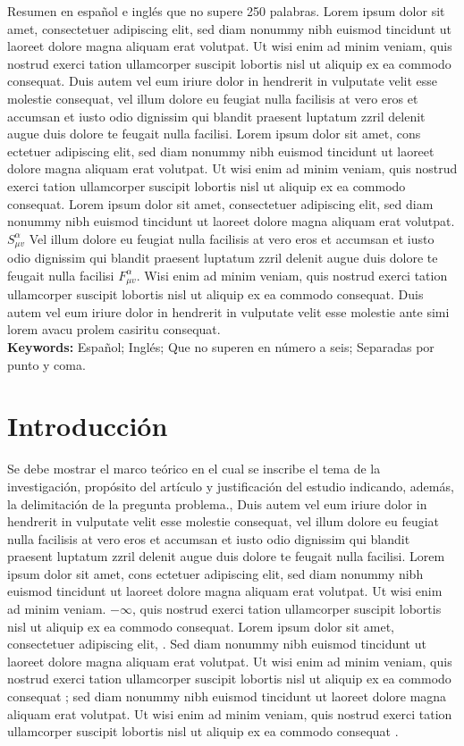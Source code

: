 \documentclass[9pt]{article}
\begin{document}
\justifying
Resumen en español e inglés que no supere 250 palabras. Lorem ipsum dolor sit amet, consectetuer adipiscing elit, sed diam nonummy nibh euismod tincidunt ut laoreet dolore magna aliquam erat volutpat. Ut wisi enim ad minim veniam, quis nostrud exerci tation ullamcorper suscipit lobortis nisl ut aliquip ex ea commodo consequat. Duis autem vel eum iriure dolor in hendrerit in vulputate velit esse molestie consequat, vel illum dolore eu feugiat nulla facilisis at vero eros et accumsan et iusto odio dignissim qui blandit praesent luptatum zzril delenit augue duis dolore te feugait nulla facilisi. Lorem ipsum dolor sit amet, cons ectetuer adipiscing elit, sed diam nonummy nibh euismod tincidunt ut laoreet dolore magna aliquam erat volutpat. Ut wisi enim ad minim veniam, quis nostrud exerci tation ullamcorper suscipit lobortis nisl ut aliquip ex ea commodo consequat. Lorem ipsum dolor sit amet, consectetuer adipiscing elit, sed diam nonummy nibh euismod tincidunt ut laoreet dolore magna aliquam erat volutpat.
$S^{\alpha}_{\mu v}$ Vel illum dolore eu feugiat nulla facilisis at vero eros et accumsan et iusto odio dignissim qui blandit praesent luptatum zzril delenit augue duis dolore te feugait nulla facilisi $F^{\alpha}_{\mu v}$. Wisi enim ad minim veniam, quis nostrud exerci tation ullamcorper suscipit lobortis nisl ut aliquip ex ea commodo consequat. Duis autem vel eum iriure dolor in hendrerit in vulputate velit esse molestie ante simi lorem avacu prolem casiritu consequat.\\[0.2cm]
\textbf{Keywords:} Español; Inglés; Que no superen en número a seis; Separadas por punto y coma. 


\section*{Introducción}

Se debe mostrar el marco teórico en el cual se inscribe el tema de la investigación, propósito del artículo y justificación del estudio indicando, además, la delimitación de la pregunta problema.\citep{ostrogradski2007memoires}, Duis autem vel eum iriure dolor in hendrerit in vulputate velit esse molestie consequat, vel illum dolore eu feugiat nulla facilisis at vero eros et accumsan et iusto odio dignissim qui blandit praesent luptatum zzril delenit augue duis dolore te feugait nulla facilisi. Lorem ipsum dolor sit amet, cons ectetuer adipiscing elit, sed diam nonummy nibh euismod tincidunt ut laoreet dolore magna aliquam erat volutpat. Ut wisi enim ad minim veniam.  $-\infty$, quis nostrud exerci tation ullamcorper suscipit lobortis nisl ut aliquip ex ea commodo consequat.
Lorem ipsum dolor sit amet, consectetuer adipiscing elit, \citep{woodard2007avoiding}. Sed diam nonummy nibh euismod tincidunt ut laoreet dolore magna aliquam erat volutpat. Ut wisi enim ad minim veniam, quis nostrud exerci tation ullamcorper suscipit lobortis nisl ut aliquip ex ea commodo consequat \parencite{woodard2007avoiding}; sed diam nonummy nibh euismod tincidunt ut laoreet dolore magna aliquam erat volutpat. Ut wisi enim ad minim veniam, quis nostrud exerci tation ullamcorper suscipit lobortis nisl ut aliquip ex ea commodo consequat \citep{nicolis2009galileon}. 
\end{document}
